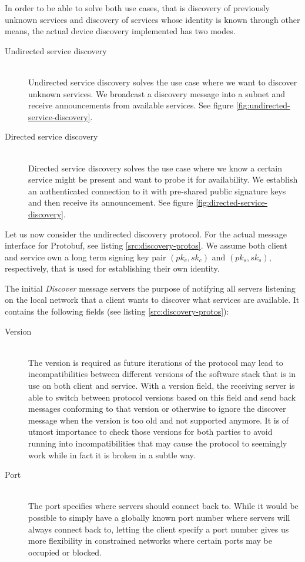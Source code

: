 In order to be able to solve both use cases, that is discovery of previously unknown services and discovery of services whose identity is known through other means, the actual device discovery implemented has two modes.
\begin{description}
    \item[Undirected service discovery]\hfill\\
        Undirected service discovery solves the use case where we want to discover unknown services.
        We broadcast a discovery  message into a subnet and receive announcements from available services.
        See figure \ref{fig:undirected-service-discovery}.
    \item[Directed service discovery]\hfill\\
        Directed service discovery solves the use case where we know a certain service might be present and want to probe it for availability.
        We establish an authenticated connection to it with pre-shared public signature keys and then receive its announcement.
        See figure \ref{fig:directed-service-discovery}.
\end{description}

Let us now consider the undirected discovery protocol.
For the actual message interface for Protobuf, see listing \ref{src:discovery-protos}.
We assume both client and service own a long term signing key pair $(pk_c, sk_c)$ and $(pk_s, sk_s)$, respectively, that is used for establishing their own identity.

The initial \emph{Discover} message servers the purpose of notifying all servers listening on the local network that a client wants to discover what services are available.
It contains the following fields (see listing \ref{src:discovery-protos}):

\begin{description}
    \item[Version]\hfill\\
        The version is required as future iterations of the protocol may lead to incompatibilities between different versions of the software stack that is in use on both client and service.
        With a version field, the receiving server is able to switch between protocol versions based on this field and send back messages conforming to that version or otherwise to ignore the discover message when the version is too old and not supported anymore.
        It is of utmost importance to check those versions for both parties to avoid running into incompatibilities that may cause the protocol to seemingly work while in fact it is broken in a subtle way.
    \item[Port]\hfill\\
        The port specifies where servers should connect back to.
        While it would be possible to simply have a globally known port number where servers will always connect back to, letting the client specify a port number gives us more flexibility in constrained networks where certain ports may be occupied or blocked.
\end{description}


